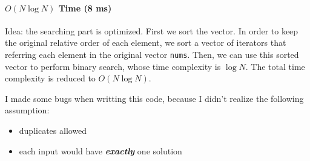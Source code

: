 \documentclass[12pt]{article}
\begin{document}
\paragraph{\(O(N\log{N})\) Time (8 ms)}
\label{sec:org5508740}
Idea: the searching part is optimized. First we sort the vector. In order to keep the original relative order of each element, we sort a vector of iterators that referring each element in the original vector \texttt{nums}. Then, we can use this sorted vector to perform binary search, whose time complexity is \(\log{N}\). The total time complexity is reduced to \(O(N\log{N})\).

I made some bugs when writting this code, because I didn't realize the following assumption:
\begin{itemize}
\item duplicates allowed
\item each input would have \textbf{\emph{exactly}} one solution
\end{itemize}
\end{document}
